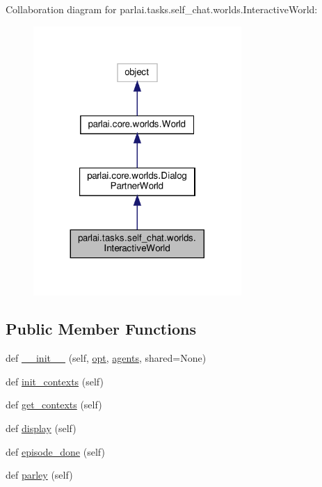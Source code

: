Collaboration diagram for parlai.\+tasks.\+self\+\_\+chat.\+worlds.\+Interactive\+World\+:
\nopagebreak
\begin{figure}[H]
\begin{center}
\leavevmode
\includegraphics[width=224pt]{classparlai_1_1tasks_1_1self__chat_1_1worlds_1_1InteractiveWorld__coll__graph}
\end{center}
\end{figure}
\subsection*{Public Member Functions}
\begin{DoxyCompactItemize}
\item 
def \hyperlink{classparlai_1_1tasks_1_1self__chat_1_1worlds_1_1InteractiveWorld_a05a58b87b6b23a3a5c6ca1aca8ec230f}{\+\_\+\+\_\+init\+\_\+\+\_\+} (self, \hyperlink{classparlai_1_1core_1_1worlds_1_1World_a3640d92718acd3e6942a28c1ab3678bd}{opt}, \hyperlink{classparlai_1_1core_1_1worlds_1_1DialogPartnerWorld_a04185d1d55ca86c96c796f12f2226fc9}{agents}, shared=None)
\item 
def \hyperlink{classparlai_1_1tasks_1_1self__chat_1_1worlds_1_1InteractiveWorld_a79ab60d667e6e4155a375ba6fa11a946}{init\+\_\+contexts} (self)
\item 
def \hyperlink{classparlai_1_1tasks_1_1self__chat_1_1worlds_1_1InteractiveWorld_acc9ee34b52a3f17b4d7593c3eb39dd7e}{get\+\_\+contexts} (self)
\item 
def \hyperlink{classparlai_1_1tasks_1_1self__chat_1_1worlds_1_1InteractiveWorld_aa9b72efe99c4deac0224d4afcdb84ebc}{display} (self)
\item 
def \hyperlink{classparlai_1_1tasks_1_1self__chat_1_1worlds_1_1InteractiveWorld_ac5340171ef38cc918534f6315d5f4b85}{episode\+\_\+done} (self)
\item 
def \hyperlink{classparlai_1_1tasks_1_1self__chat_1_1worlds_1_1InteractiveWorld_aba09c917d6cf7c2df128a75198be1b12}{parley} (self)
\end{DoxyCompactItemize}
